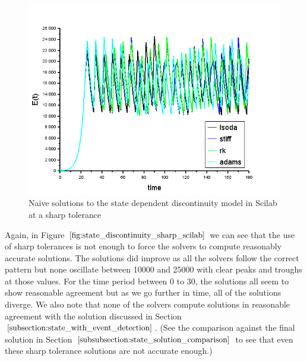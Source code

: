 \begin{figure}[H]
\centering
\includegraphics[width=0.7\linewidth]{./figures/state_discontinuity_sharp_sci}
\caption{Naive solutions to the state dependent discontinuity model in Scilab at a sharp tolerance}
\label{fig:state_discontinuity_sharp_scilab}
\end{figure}

Again, in Figure $\ref{fig:state_discontinuity_sharp_scilab}$ we can see that the use of sharp tolerances is not enough to force the solvers to compute reasonably accurate solutions. The solutions did improve as all the solvers follow the correct pattern but none oscillate between 10000 and 25000 with clear peaks and troughs at those values. For the time period between 0 to 30, the solutions all seem to show reasonable agreement but as we go further in time, all of the solutions diverge. We also note that none of the solvers compute solutions in reasonable agreement with the solution discussed in Section $\ref{subsection:state_with_event_detection}$. (See the comparison against the final solution in Section $\ref{subsubsection:state_solution_comparison}$ to see that even these sharp tolerance solutions are not accurate enough.)



